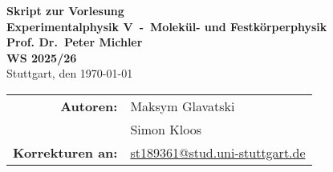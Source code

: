 \newcommand{\LectureTitle}{Experimentalphysik V}
\newcommand{\LectureSubtitle}{Molekül- und Festkörperphysik}
\newcommand{\LectureSemester}{WS 2025/26}
\newcommand{\LecturerTitle}{Prof. Dr.}
\newcommand{\LecturerName}{Peter Michler}

\newcommand{\LatestUpdate}{\today}

\newcommand{\AuthorOne}{Maksym Glavatski}
\newcommand{\AuthorTwo}{Simon Kloos}
\newcommand{\ContactEmail}{\href{mailto:st189361@stud.uni-stuttgart.de}{st189361@stud.uni-stuttgart.de}}


\newcommand{\ttpgfont}{\fontfamily{phv}\selectfont}
\renewcommand{\ttpgfont}{}

\begin{titlepage}
    \centering

    \Large \textbf{\ttpgfont Skript zur Vorlesung}\\
    \Huge \textbf{\ttpgfont\LectureTitle~-~\LectureSubtitle}\\[2ex]
    \textbf{\ttpgfont \LecturerTitle~\LecturerName}\\[0.5ex] 
    \Large \textbf{\ttpgfont\LectureSemester}\\[2ex]

    \Large Stuttgart, den \LatestUpdate\\
    \vspace{\fill}

    \Large\centering
    \begin{tabular}{r l}
    \textbf{Autoren:}&\AuthorOne\\
    &\AuthorTwo\\
    \textbf{Korrekturen an:}&\ContactEmail
    \end{tabular}
    

\end{titlepage}